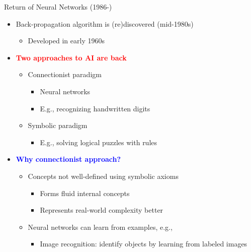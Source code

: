 \documentclass[
  10pt,
  ignorenonframetext,
]{beamer}
\providecommand{\tightlist}{%
  \setlength{\itemsep}{0pt}\setlength{\parskip}{0pt}}
\begin{document}
\begin{frame}{Return of Neural Networks (1986-)}
\label{return-of-neural-networks-1986-}
\begin{itemize}
\tightlist
\item
  Back-propagation algorithm is (re)discovered (mid-1980s)

  \begin{itemize}
  \tightlist
  \item
    Developed in early 1960s
  \end{itemize}
\item
  \textbf{\textcolor{red}{Two approaches to AI are back}}

  \begin{itemize}
  \tightlist
  \item
    Connectionist paradigm

    \begin{itemize}
    \tightlist
    \item
      Neural networks
    \item
      E.g., recognizing handwritten digits
    \end{itemize}
  \item
    Symbolic paradigm

    \begin{itemize}
    \tightlist
    \item
      E.g., solving logical puzzles with rules
    \end{itemize}
  \end{itemize}
\item
  \textbf{\textcolor{blue}{Why connectionist approach?}}

  \begin{itemize}
  \tightlist
  \item
    Concepts not well-defined using symbolic axioms

    \begin{itemize}
    \tightlist
    \item
      Forms fluid internal concepts
    \item
      Represents real-world complexity better
    \end{itemize}
  \item
    Neural networks can learn from examples, e.g.,

    \begin{itemize}
    \tightlist
    \item
      Image recognition: identify objects by learning from labeled
      images
    \end{itemize}
  \end{itemize}
\end{itemize}
\end{frame}
\end{document}
